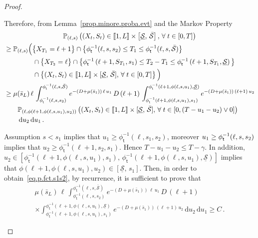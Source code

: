 \documentclass[10pt]{amsart}
\theoremstyle{definition}\newtheorem{defi}[theo]{Definition}\newtheorem{rema}[theo]{Remark}\newtheorem{exam}[theo]{Example}\newtheorem{exem}[theo]{Example}\newtheorem{nota}[theo]{Notation}
\newcommand{\llbracket}{\mathopen{[\mkern -2.7mu[}}
\newcommand{\rrbracket}{\mathclose{]\mkern -2.7mu]}}
\newcommand{\PP}{\mathbb{P}}
\newcommand{\dif}{\mathrm{d}}
\newcommand{\Smin}{\underline{\mathcal{S}}}
\newcommand{\Smax}{\bar{\mathcal{S}}}
\newcommand{\barmu}{\mu(\bar s_1)}
\newcommand{\phit}{\phi_\textsf{t}^{-1}}
\newcommand{\setunL}{\llbracket 1, L\rrbracket}
\newcommand{\1}{\mathbf{1}}
\let\oldforall\forall
\renewcommand*{\forall}{\mathrel{\oldforall}}
\begin{document}
\begin{proof}
\begin{itemize}
Therefore, from Lemma~\ref{prop.minore.proba.evt} and the Markov Property
\begin{multline}\label{expression.k_plus_un}
\PP_{(\ell,s)}
\left(\left(X_t,S_t\right) \in \setunL \times \left[\Smin, \, \Smax\right], \,
\forall t\in[0,T]\right)
\\
\begin{aligned}
& \geq
\PP_{(\ell,s)}
\Big(\big\{X_{T_{1}}=\ell+1\big\}\cap \big\{\phit(\ell,s,s_2)\leq T_1\leq \phit(\ell,s,\Smax) \big\}
\\
&\qquad\qquad\;
\cap \big\{X_{T_{2}}=\ell\big\}\cap \big\{\phit\left(\ell+1,S_{T_1},s_1\right)\leq T_2-T_1\leq \phit\left(\ell+1,S_{T_1},\Smin\right)\big\}
\\
&\qquad\qquad\;
\cap \left\{(X_t,S_t) \in \setunL \times [\Smin, \, \Smax], \,
\forall t\in[0,T]\right\}\Big)
\\
&\geq
\mu(\bar s_L) \,\ell\,
\int_{\phit(\ell,s,s_2)}^{\phit(\ell,s,\Smax)} e^{-(D+\barmu)\,\ell\,u_1} \, D\,(\ell+1)\,
\int_{\phit\left(\ell+1,\phi(\ell,s,u_1),s_1\right)}^{\phit\left(\ell+1,\phi(\ell,s,u_1),\Smin\right)} e^{-(D+\barmu)\,(\ell+1)\,u_2}
\\
& \qquad
\PP_{\left(\ell,\phi(\ell+1,\phi(\ell,s,u_1),u_2)\right)}
\left((X_t,S_t) \in \setunL \times [\Smin, \, \Smax], \,
\forall t\in[0,(T-u_1-u_2)\vee 0]\right)
\\
& \qquad
\,\dif u_2\,\dif u_1\,.
\end{aligned}
\end{multline}

Assumption $s<s_1$ implies that $u_1\geq \phit(\ell,s_1, s_2)$, moreover $u_1\geq \phit(\ell,s,\linebreak s_2)$ implies that $u_2 \geq \phit(\ell+1,s_2,s_1)$. Hence $T-u_1-u_2 \leq T-\gamma$. In addition, $u_2\in [\phit(\ell+1,\phi(\ell,s,u_1),s_1),\, \phit(\ell+1,\phi(\ell,s,u_1),\Smin)]$ implies that $\phi(\ell+1,\phi(\ell,s,u_1),u_2)\in[\Smin,\,s_1]$. Then, in order to obtain~\eqref{eq.p.fct.s1s2}, by recurrence, it is sufficient to prove that
\begin{multline}\label{proba.minoree.C}
\mu(\bar s_L) \,\ell\,
\int_{\phit(\ell,s,s_2)}^{\phit(\ell,s,\Smax)} e^{-(D+\barmu)\,\ell\,u_1} \, D\,(\ell+1)\,\\
\times
\int_{\phit\left(\ell+1,\phi(\ell,s,u_1),s_1\right)}^{\phit\left(\ell+1,\phi(\ell,s,u_1),\Smin\right)} e^{-(D+\barmu)\,(\ell+1)\,u_2}\,\dif u_2\,\dif u_1
\geq C\,.
\end{multline}


\end{itemize}
\end{proof}
\end{document}
